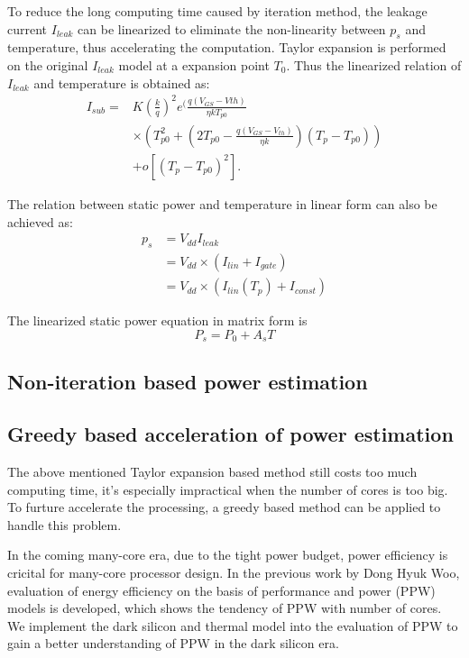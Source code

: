 To reduce the long computing time caused by iteration method, the leakage current $I_{leak}$ 
can be linearized to eliminate the non-linearity between $p_{s}$ and temperature, thus 
accelerating the computation.
Taylor expansion is performed on the original $I_{leak}$ model at a expansion point $T_{0}$. 
Thus the linearized relation of $I_{leak}$ and temperature is obtained as:
\begin{equation}\label{linear_subthreshold}
\begin{split}
I_{sub} = &K(\frac{k}{q})^{2}e^(\frac{q(V_{GS}-V{th})}{\eta kT_{p0}}\\
&\times (T_{p0}^{2}+(2T_{p0}-\frac{q(V_{GS}-V_{th})}{\eta k})(T_{p}-T_{p0}))\\
&+ o[(T_{p}-T_{p0})^{2}].
\end{split}
\end{equation}

The relation between static power and temperature in linear form can also be achieved as:
\begin{equation}\label{linear_static}
\begin{split}
p_{s} &= V_{dd}I_{leak}\\
&= V_{dd} \times (I_{lin}+I_{gate})\\
&= V_{dd} \times (I_{lin}(T_{p})+I_{const})
\end{split}
\end{equation}

The linearized static power equation in matrix form is
\begin{equation}\label{linear_static_matrix}
P_{s} = P_{0}+A_{s}T
\end{equation}

\subsection{Non-iteration based power estimation}

\subsection{Greedy based acceleration of power estimation}
The above mentioned Taylor expansion based method still costs too much computing time, it's 
especially impractical when the number of cores is too big. To furture accelerate the 
processing, a greedy based method can be applied to handle this problem. 






In the coming many-core era, due to the tight power budget, power efficiency is cricital for
many-core processor design. In the previous work by Dong Hyuk Woo, evaluation of energy
efficiency on the basis of performance and power (PPW) models is developed, which shows the
tendency of PPW with number of cores. We implement the dark silicon and thermal model into the
evaluation of PPW to gain a better understanding of PPW in the dark silicon era.

